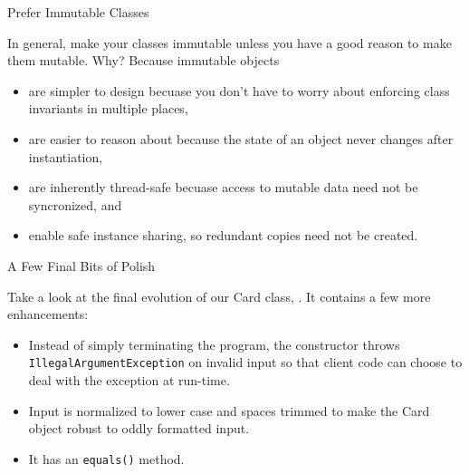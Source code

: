 \documentclass{beamer}
\begin{document}
\begin{frame}[fragile]{Prefer Immutable Classes}


In general, make your classes immutable unless you have a good reason to make them mutable.  Why?  Because immutable objects
\begin{itemize}
\item are simpler to design becuase you don't have to worry about enforcing class invariants in multiple places,
\item are easier to reason about because the state of an object never changes after instantiation,
\item are inherently thread-safe becuase access to mutable data need not be syncronized, and
\item enable safe instance sharing, so redundant copies need not be created.
\end{itemize}

\end{frame}

\begin{frame}[fragile]{A Few Final Bits of Polish}


Take a look at the final evolution of our Card class, .  It contains a few more enhancements:
\begin{itemize}
\item Instead of simply terminating the program, the constructor throws {\tt IllegalArgumentException} on invalid input so that client code can choose to deal with the exception at run-time.
\item Input is normalized to lower case and spaces trimmed to make the Card object robust to oddly formatted input.
\item It has an {\tt equals()} method.
\end{itemize}


\end{frame}
\end{document}
